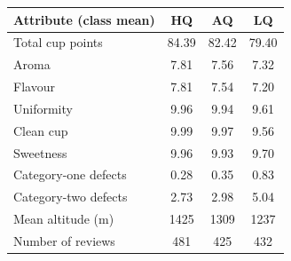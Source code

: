 \begin{tabular}{lccc}
\toprule
\textbf{Attribute (class mean)} & \textbf{HQ} & \textbf{AQ} & \textbf{LQ} \\
\midrule
Total cup points & 84.39 & 82.42 & 79.40 \\
Aroma & 7.81 & 7.56 & 7.32 \\
Flavour & 7.81 & 7.54 & 7.20 \\
Uniformity & 9.96 & 9.94 & 9.61 \\
Clean cup & 9.99 & 9.97 & 9.56 \\
Sweetness & 9.96 & 9.93 & 9.70 \\
Category-one defects & 0.28 & 0.35 & 0.83 \\
Category-two defects & 2.73 & 2.98 & 5.04 \\
Mean altitude (m) & 1425 & 1309 & 1237 \\
Number of reviews & 481 & 425 & 432 \\
\bottomrule
\end{tabular}
